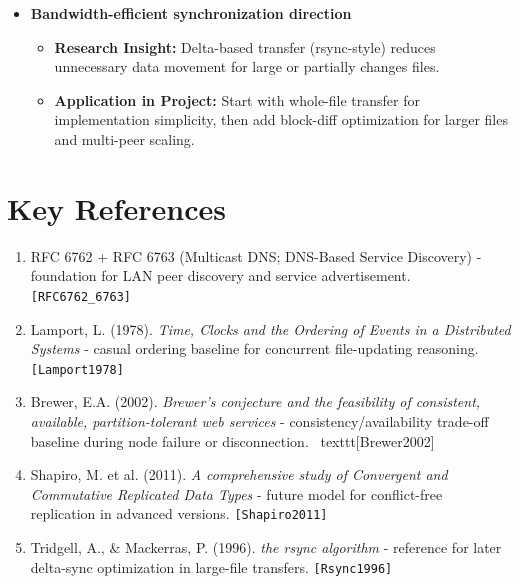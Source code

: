\documentclass[11pt,oneside]{article}
\begin{document}
\begin{itemize}
\item \textbf{Bandwidth-efficient synchronization direction}
\begin{itemize}
\item \textbf{Research Insight:} Delta-based transfer (rsync-style) reduces unnecessary data movement for large or partially changes files.
\item \textbf{Application in Project:} Start with whole-file transfer for implementation simplicity, then add block-diff optimization for larger files and multi-peer scaling. 
\end{itemize}
\end{itemize}
\section{Key References}
\begin{enumerate}
	\item RFC 6762 + RFC 6763 (Multicast DNS; DNS-Based Service Discovery) - foundation for LAN peer discovery and service advertisement. \texttt{[RFC6762\_6763]}
	\item Lamport, L. (1978). \textit{Time, Clocks and the Ordering of Events in a Distributed Systems} - casual ordering baseline for concurrent file-updating reasoning. \texttt{[Lamport1978]}
	\item Brewer, E.A. (2002). \textit{Brewer’s conjecture and the feasibility of consistent, available, partition-tolerant web services} - consistency/availability trade-off baseline during node failure or disconnection. \ texttt{[Brewer2002]}
	\item Shapiro, M. et al. (2011). \textit{A comprehensive study of Convergent and Commutative Replicated Data Types} - future model for conflict-free replication in advanced versions. \texttt{[Shapiro2011]}
	\item Tridgell, A., \& Mackerras, P. (1996). \textit{the rsync algorithm} - reference for later delta-sync optimization in large-file transfers. \texttt{[Rsync1996]}
\end{enumerate}
\end{document}
